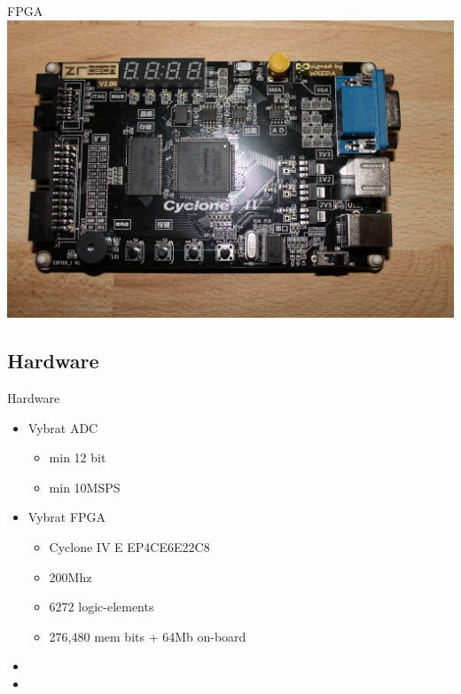 \documentclass{beamer}
\begin{document}
	\begin{frame}{FPGA}
		\includegraphics[width=\paperwidth]{ZRtech_board.jpg}
	\end{frame}

	\subsection{Hardware}
	\begin{frame}{Hardware}
		\begin{itemize}
			\item Vybrat ADC
				\begin{itemize}
					\item min 12 bit 
					\item min 10MSPS
				\end{itemize}
			\item Vybrat FPGA
				\begin{itemize}
					\item Cyclone IV E EP4CE6E22C8
					\item 200Mhz
					\item 6272 logic-elements
					\item 276,480 mem bits + 64Mb on-board
				\end{itemize}			
			\item[]
			\item[]
		\end{itemize}
	\end{frame}


	
\end{document}
